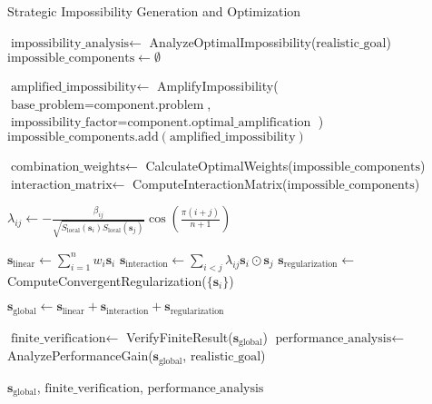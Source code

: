 \documentclass[11pt]{article}
\theoremstyle{definition}
\theoremstyle{remark}
\begin{document}
\begin{algorithm}[H]
\caption{Strategic Impossibility Generation and Optimization}
\label{alg:strategic_impossibility}
\begin{algorithmic}[1]
    \State $\text{impossibility\_analysis} \gets$ AnalyzeOptimalImpossibility($\text{realistic\_goal}$)
    \State $\text{impossible\_components} \gets \emptyset$
    
        \State $\text{amplified\_impossibility} \gets$ AmplifyImpossibility(
        \State \hspace{2em} $\text{base\_problem} = \text{component.problem}$,
        \State \hspace{2em} $\text{impossibility\_factor} = \text{component.optimal\_amplification}$
        \State )
        \State $\text{impossible\_components.add}(\text{amplified\_impossibility})$
    \EndFor
    
    \State $\text{combination\_weights} \gets$ CalculateOptimalWeights($\text{impossible\_components}$)
    \State $\text{interaction\_matrix} \gets$ ComputeInteractionMatrix($\text{impossible\_components}$)
    
        \State $\lambda_{ij} \gets -\frac{\beta_{ij}}{\sqrt{S_{\text{local}}(\mathbf{s}_i) S_{\text{local}}(\mathbf{s}_j)}} \cos\left(\frac{\pi(i+j)}{n+1}\right)$
    \EndFor
    
    \State $\mathbf{s}_{\text{linear}} \gets \sum_{i=1}^n w_i \mathbf{s}_i$
    \State $\mathbf{s}_{\text{interaction}} \gets \sum_{i<j} \lambda_{ij} \mathbf{s}_i \odot \mathbf{s}_j$
    \State $\mathbf{s}_{\text{regularization}} \gets$ ComputeConvergentRegularization($\{\mathbf{s}_i\}$)
    
    \State $\mathbf{s}_{\text{global}} \gets \mathbf{s}_{\text{linear}} + \mathbf{s}_{\text{interaction}} + \mathbf{s}_{\text{regularization}}$
    
    \State $\text{finite\_verification} \gets$ VerifyFiniteResult($\mathbf{s}_{\text{global}}$)
    \State $\text{performance\_analysis} \gets$ AnalyzePerformanceGain($\mathbf{s}_{\text{global}}$, $\text{realistic\_goal}$)
    
    \State \Return $\mathbf{s}_{\text{global}}$, $\text{finite\_verification}$, $\text{performance\_analysis}$
\EndProcedure
\end{algorithmic}
\end{algorithm}
\end{document}

